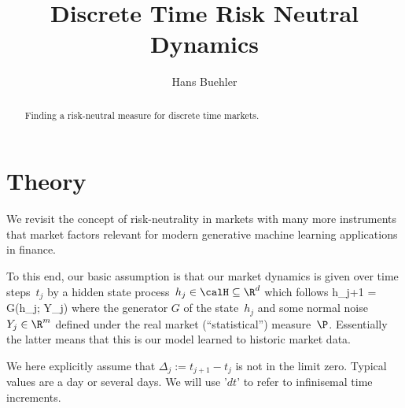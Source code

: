 \documentclass{hbarticle}
\title{Discrete Time Risk Neutral Dynamics}
\author{Hans Buehler}
\begin{document}
    \maketitle
    
    \begin{abstract}
        Finding a risk-neutral measure for discrete time
        markets.
    \end{abstract}

    \tableofcontents

    \section{Theory}
    
    We revisit the concept of risk-neutrality in markets with many
    more instruments that market factors relevant for modern generative
    machine learning applications in finance.
    
    To this end, our basic assumption is that our market dynamics
    is given over time steps~$t_j$ by a hidden state process~$h_j\in \calH \subseteq \R^d$
    which follows
    	h_{j+1} = G(h_j; Y_j)   
    \eqend
    where the generator $G$ of the state~$h_j$ 
    and some normal noise $Y_j\in \R^m$ defined
    under the real market (``statistical'') measure~$\P$. Essentially
    the latter means that this is our model learned to historic market data.


       
    We here explicitly assume
    that $\Delta_j := t_{j+1} - t_j$
    is not in the limit zero. Typical values are
    a day or several days. We will use '$dt$' to refer to infinisemal
    time increments.
   
\end{document}
